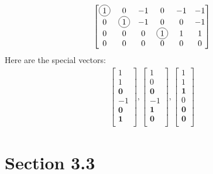 \documentclass[a4paper,11pt]{article}
\newcommand*\circled[1]{\tikz[baseline=(char.base)]{
             \node[shape=circle,draw,inner sep=2pt] (char) {#1};}}
\newcommand{\mybf}[1]{\boldsymbol{#1}}
\begin{document}
\begin{align}
\begin{bmatrix}
\circled{ 1} &           0  & -1  &            0 &  -1 &   -1 \\
0            & \circled{ 1} & -1  &            0 &  0  &  -1 \\
0            &           0  &  0  & \circled{ 1} &  1  &   1 \\
0            &           0  &  0  &            0 &  0  &   0 \\
\end{bmatrix}
\end{align}
Here are the special vectors:
\begin{align}
\begin{bmatrix}
1 \\
1 \\
\mybf{0} \\
-1 \\
\mybf{0} \\
\mybf{1} \\
\end{bmatrix}
,
\begin{bmatrix}
1 \\
0 \\
\mybf{0} \\
-1 \\
\mybf{1} \\
\mybf{0} \\
\end{bmatrix}
,
\begin{bmatrix}
1 \\
1 \\
\mybf{1} \\
0 \\
\mybf{0} \\
\mybf{0} \\
\end{bmatrix}
\end{align}
\section*{Section 3.3}
\end{document}
